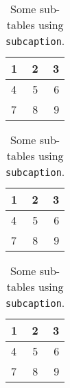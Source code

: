 \begin{table}[t]
\centering
\begin{subtable}[b]{0.32\linewidth}
    \centering
    \begin{tabular}{lcr}
        \hline
        1 & 2 & 3 \\
        \hline
        4 & 5 & 6 \\
        7 & 8 & 9 \\
        \hline
    \end{tabular}
    \label{tab:subcaption-subtable1}
\end{subtable}
\begin{subtable}[b]{0.32\linewidth}
    \centering
    \begin{tabular}{lcr}
        \hline
        1 & 2 & 3 \\
        \hline
        4 & 5 & 6 \\
        7 & 8 & 9 \\
        \hline
    \end{tabular}
    \label{tab:subcaption-subtable2}
\end{subtable}
\begin{subtable}[b]{0.32\linewidth}
    \centering
    \begin{tabular}{lcr}
        \hline
        1 & 2 & 3 \\
        \hline
        4 & 5 & 6 \\
        7 & 8 & 9 \\
        \hline
    \end{tabular}
    \label{tab:subcaption-subtable3}
\end{subtable}
\caption{Some sub-tables using \texttt{subcaption}.}
\label{tab:subcaption-subtables}
\end{table}

